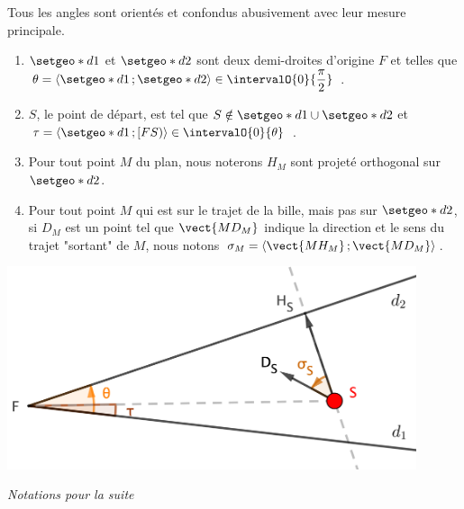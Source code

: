 Tous les angles sont orientés et confondus abusivement avec leur mesure principale.
\begin{enumerate}
	\item $\setgeo*{d}{1}$ et $\setgeo*{d}{2}$ sont deux demi-droites d'origine $F$ et telles que $\theta = \langle \setgeo*{d}{1} \,; \setgeo*{d}{2} \rangle \in \intervalO{0}{\dfrac{\pi}{2}}$ .

	\item $S$, le point de départ, est tel que $S \notin \setgeo*{d}{1} \cup \setgeo*{d}{2}$ et $\tau = \langle \setgeo*{d}{1} \,; [FS) \rangle \in \intervalO{0}{\theta}$ .
	
	\item Pour tout point $M$ du plan, nous noterons $H_M$ sont projeté orthogonal sur $\setgeo*{d}{2}$.
	
	\item Pour tout point $M$ qui est sur le trajet de la bille, mais pas sur $\setgeo*{d}{2}$, si $D_M$ est un point tel que $\vect{MD_M}$ indique la direction et le sens du trajet "sortant" de $M$, nous notons $\sigma_M = \langle \vect{MH_M} \,; \vect{MD_M} \rangle$.
\end{enumerate}


\medskip


\begin{center}
	\includegraphics[width=12cm]{content/proof-notations.png}
	
	\itshape\small
	Notations pour la suite
\end{center}


